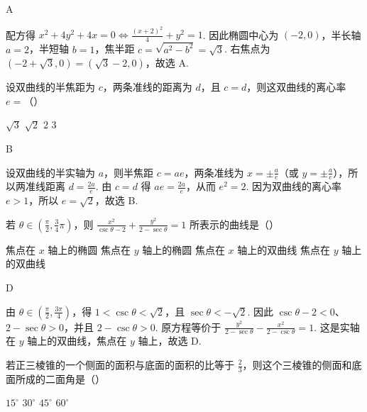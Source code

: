 \begin{answer}A\end{answer}

\begin{solution}
配方得 \(x^{2}+4y^{2}+4x=0\iff\frac{(x+2)^{2}}4+y^{2}=1\). 因此椭圆中心为 \((-2,0)\)，半长轴 \(a=2\)，半短轴 \(b=1\)，焦半距 \(c=\sqrt{a^{2}-b^{2}}=\sqrt3\). 右焦点为 \((-2+\sqrt3,0)=(\sqrt3-2,0)\)，故选 A.
\end{solution}

\begin{problem}
设双曲线的半焦距为 \(c\)，两条准线的距离为 \(d\)，且 \(c=d\)，则这双曲线的离心率 \(e=\)（\quad）

\choices
{\(\sqrt3\)}
{\(\sqrt2\)}
{\(2\)}
{\(3\)}
\end{problem}

\begin{answer}B\end{answer}

\begin{solution}
设双曲线的半实轴为 \(a\)，则半焦距 \(c=ae\)，两条准线为 \(x=\pm\frac ae\)（或 \(y=\pm\frac ae\)），所以两准线距离 \(d=\frac{2a}{e}\). 由 \(c=d\) 得 \(ae=\frac{2a}{e}\)，从而 \(e^{2}=2\). 因为双曲线的离心率 \(e>1\)，所以 \(e=\sqrt2\)，故选 B.
\end{solution}

\begin{problem}
若 \(\theta\in\left(\frac\pi2,\frac34\pi\right)\)，则 \(\displaystyle\frac{x^{2}}{\csc\theta-2}+\frac{y^{2}}{2-\sec\theta}=1\) 所表示的曲线是（\quad）

\choices
{焦点在 \(x\) 轴上的椭圆}
{焦点在 \(y\) 轴上的椭圆}
{焦点在 \(x\) 轴上的双曲线}
{焦点在 \(y\) 轴上的双曲线}
\end{problem}

\begin{answer}D\end{answer}

\begin{solution}
由 \(\theta\in\left(\frac\pi2,\frac{3\pi}{4}\right)\)，得 \(1<\csc\theta<\sqrt2\)，且 \(\sec\theta<-\sqrt2\). 因此 \(\csc\theta-2<0\)、\(2-\sec\theta>0\)，并且 \(2-\csc\theta>0\). 原方程等价于
\(\displaystyle\frac{y^{2}}{2-\sec\theta}-\frac{x^{2}}{2-\csc\theta}=1\).
这是实轴在 \(y\) 轴上的双曲线，焦点在 \(y\) 轴上，故选 D.
\end{solution}

\begin{problem}
若正三棱锥的一个侧面的面积与底面的面积的比等于 \(\frac23\)，则这个三棱锥的侧面和底面所成的二面角是（\quad）

\choices
{\(15^{\circ}\)}
{\(30^{\circ}\)}
{\(45^{\circ}\)}
{\(60^{\circ}\)}
\end{problem}

